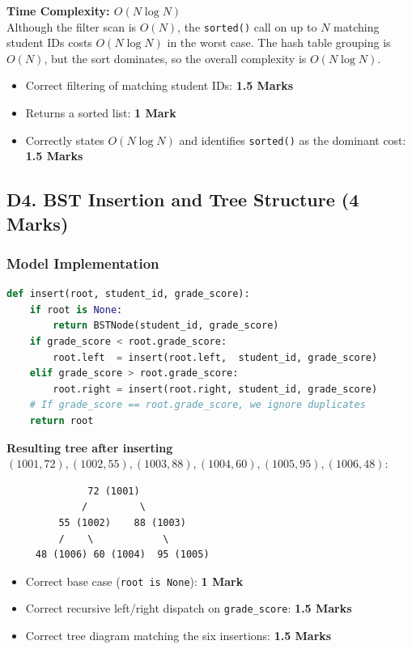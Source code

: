 \documentclass[11pt,a4paper]{article}
\newenvironment{markbox}[1]{%
    \begin{tcolorbox}[colback=markgreen!6!white, colframe=markgreen, title=\textbf{Mark Allocation --- #1}]
}{%
    \end{tcolorbox}
}
\begin{document}
\textbf{Time Complexity: $O(N \log N)$} \\
Although the filter scan is $O(N)$, the \texttt{sorted()} call on up to $N$ matching student IDs costs $O(N \log N)$ in the worst case. The hash table grouping is $O(N)$, but the sort dominates, so the overall complexity is $O(N \log N)$.

\begin{markbox}{D3 --- 4 Marks}
\begin{itemize}
    \item Correct filtering of matching student IDs: \textbf{1.5 Marks}
    \item Returns a sorted list: \textbf{1 Mark}
    \item Correctly states $O(N \log N)$ and identifies \texttt{sorted()} as the dominant cost: \textbf{1.5 Marks}
\end{itemize}
\end{markbox}

\subsection*{D4. BST Insertion and Tree Structure (4 Marks)}

\subsubsection*{Model Implementation}
\begin{lstlisting}[language=Python]
def insert(root, student_id, grade_score):
    if root is None:
        return BSTNode(student_id, grade_score)
    if grade_score < root.grade_score:
        root.left  = insert(root.left,  student_id, grade_score)
    elif grade_score > root.grade_score:
        root.right = insert(root.right, student_id, grade_score)
    # If grade_score == root.grade_score, we ignore duplicates
    return root
\end{lstlisting}

\textbf{Resulting tree after inserting} $(1001,72), (1002,55), (1003,88), (1004,60), (1005,95), (1006,48)$:

\begin{verbatim}
              72 (1001)
             /         \
         55 (1002)    88 (1003)
         /    \            \
     48 (1006) 60 (1004)  95 (1005)
\end{verbatim}

\begin{markbox}{D4 --- 4 Marks}
\begin{itemize}
    \item Correct base case (\texttt{root is None}): \textbf{1 Mark}
    \item Correct recursive left/right dispatch on \texttt{grade\_score}: \textbf{1.5 Marks}
    \item Correct tree diagram matching the six insertions: \textbf{1.5 Marks}
\end{itemize}
\end{markbox}
\end{document}
